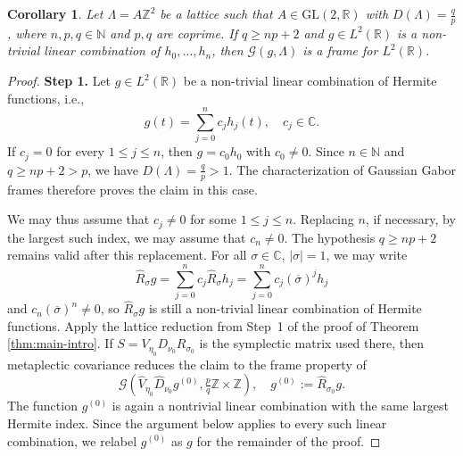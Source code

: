\documentclass[reqno,a4paper,12pt]{amsart}
\numberwithin{equation}{section}
\newtheorem{corollary}[definition]{Corollary}
\newcommand{\N}{\mathbb N}
\newcommand{\Z}{\mathbb Z}
\newcommand{\R}{\mathbb R}
\newcommand{\C}{\mathbb C}
\newcommand{\calG}{\mathcal G}
\begin{document}
\begin{corollary}\label{cor:higher_order}
    Let $\Lambda=A\Z^2$ be a lattice such that $A\in\mathrm{GL}(2,\R)$ with $D(\Lambda)=\frac qp$, where $n, p,q\in\N$ and $p,q$ are coprime.
If
$
q\geq n p+2
$ 
and $g\in L^2(\R)$ is a non-trivial linear combination of $h_0,\dots, h_{n}$, then 
$
\calG(g,\Lambda)
$
is a frame for $L^2(\R)$.
\end{corollary}
\begin{proof}
\textbf{Step 1.}
Let $g\in L^2(\R)$ be a non-trivial linear combination of Hermite functions, i.e.,
\begin{equation}
    g(t)=\sum\limits_{j=0}^n c_jh_j(t),\quad c_j\in\C.
\end{equation}
If $c_j=0$ for every $1\leq j\leq n$, then $g=c_0h_0$ with
$c_0\neq0$. Since $n\in\N$ and $q\geq np+2>p$, we have
$D(\Lambda)=\tfrac{q}{p}>1$. The characterization of Gaussian Gabor frames
\cite{Lyubarskii1992,Seip1992,SeipWallsten1992} therefore proves the
claim in this case.

We may thus assume that $c_j\neq0$ for some $1\leq j\leq n$.
Replacing $n$, if necessary, by the largest such index, we may assume
that $c_n\neq0$. The hypothesis $q\geq np+2$ remains valid after this
replacement. For all $\sigma\in\C$, $|\sigma|=1$, we may write
\begin{equation}\label{eq:lin_comb_sigma_action}
    \widehat{R}_\sigma g = \sum\limits_{j=0}^n c_j \widehat{R}_\sigma h_j = \sum\limits_{j=0}^n c_j (\overline{\sigma})^j h_j
\end{equation}
and $c_n (\overline{\sigma})^n\neq0$, so  $\widehat{R}_\sigma g$ is still a non-trivial linear combination of Hermite functions. 
Apply the lattice reduction from Step~1 of the proof of Theorem
\ref{thm:main-intro}.  If $S=V_{\eta_0}D_{\nu_0}R_{\sigma_0}$ is the
symplectic matrix used there, then metaplectic covariance reduces the claim to
the frame property of
$$
\calG(\widehat V_{\eta_0}\widehat D_{\nu_0}g^{(0)},
\tfrac pq\Z\times\Z),
\quad g^{(0)}:=\widehat R_{\sigma_0}g.
$$
The function $g^{(0)}$ is again a nontrivial linear combination with the same
largest Hermite index.  Since the argument below applies to every such linear
combination, we relabel $g^{(0)}$ as $g$ for the remainder of the proof.


\end{proof}
\end{document}
